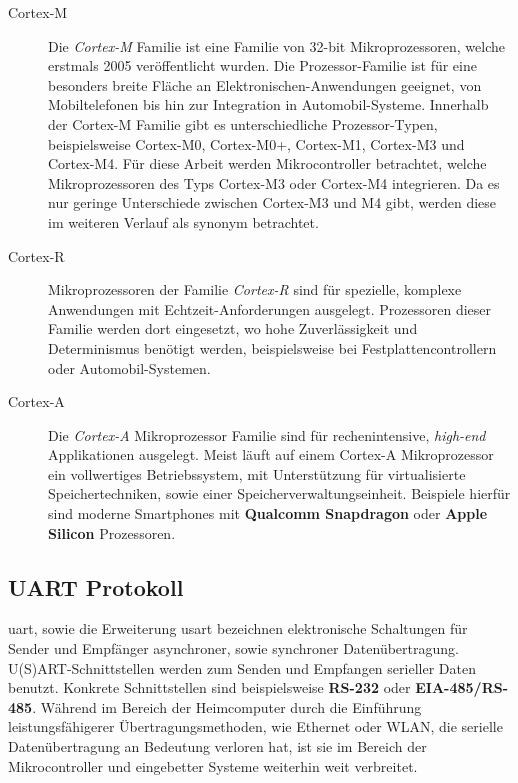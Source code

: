 \begin{description}
    \item[Cortex-M]
    Die \textit{Cortex-M} Familie ist eine Familie von 32-bit Mikroprozessoren,
    welche erstmals 2005 veröffentlicht wurden\cite{DefGuideCM34_JYiu}.
    Die Prozessor-Familie ist für eine besonders breite Fläche an
    Elektronischen-Anwendungen geeignet, von Mobiltelefonen bis hin zur
    Integration in Automobil-Systeme.
    Innerhalb der Cortex-M Familie gibt es unterschiedliche Prozessor-Typen,
    beispielsweise Cortex-M0, Cortex-M0+, Cortex-M1, Cortex-M3 und
    Cortex-M4\cite{DefGuideCM34_JYiu}.
    Für diese Arbeit werden Mikrocontroller betrachtet, welche Mikroprozessoren
    des Typs Cortex-M3 oder Cortex-M4 integrieren.
    Da es nur geringe Unterschiede zwischen Cortex-M3 und M4 gibt, werden diese
    im weiteren Verlauf als synonym betrachtet.
    \item[Cortex-R] 
    Mikroprozessoren der Familie \textit{Cortex-R} sind für spezielle, komplexe
    Anwendungen mit Echtzeit-Anforderungen ausgelegt.
    Prozessoren dieser Familie werden dort eingesetzt, wo hohe Zuverlässigkeit
    und Determinismus benötigt werden, beispielsweise bei
    Festplattencontrollern oder Automobil-Systemen\cite{DefGuideCM34_JYiu}.
    \item[Cortex-A] 
    Die \textit{Cortex-A} Mikroprozessor Familie sind für rechenintensive,
    \textit{high-end} Applikationen ausgelegt.
    Meist läuft auf einem Cortex-A Mikroprozessor ein vollwertiges
    Betriebssystem, mit Unterstützung für virtualisierte Speichertechniken,
    sowie einer Speicherverwaltungseinheit\cite{DefGuideCM34_JYiu}.
    Beispiele hierfür sind moderne Smartphones mit \textbf{Qualcomm Snapdragon}
    oder \textbf{Apple Silicon} Prozessoren.
\end{description}

\subsection{UART Protokoll}

\ac{uart}, sowie die Erweiterung \ac{usart} bezeichnen elektronische
Schaltungen für Sender und Empfänger asynchroner, sowie synchroner
Datenübertragung\cite{Digitec_WGehrke_MWinzker}.
U(S)ART-Schnittstellen werden zum Senden und Empfangen serieller Daten benutzt.
Konkrete Schnittstellen sind beispielsweise \textbf{RS-232} oder
\textbf{EIA-485/RS-485}.
Während im Bereich der Heimcomputer durch die Einführung leistungsfähigerer
Übertragungsmethoden, wie Ethernet oder WLAN, die serielle Datenübertragung an
Bedeutung verloren hat, ist sie im Bereich der Mikrocontroller und eingebetter
Systeme weiterhin weit verbreitet\cite{Digitec_WGehrke_MWinzker}.


